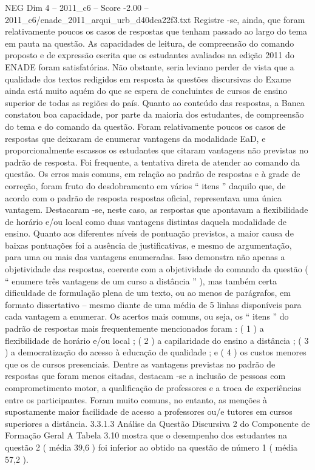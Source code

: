 \begin{textsample}{NEG Dim 4 – 2011\_c6 – Score -2.00 – 2011\_c6/enade\_2011\_arqui\_urb\_d40dca22f3.txt}
Registre -se, ainda, que foram relativamente poucos os casos de respostas que tenham passado ao largo do tema em pauta na questão.
As capacidades de leitura, de compreensão do comando proposto e de expressão escrita que os estudantes avaliados na edição 2011 do ENADE foram satisfatórias.
Não obstante, seria leviano perder de vista que a qualidade dos textos redigidos em resposta às questões discursivas do Exame ainda está muito aquém do que se espera de concluintes de cursos de ensino superior de todas as regiões do país.
Quanto ao conteúdo das respostas, a Banca constatou boa capacidade, por parte da maioria dos estudantes, de compreensão do tema e do comando da questão.
Foram relativamente poucos os casos de respostas que deixaram de enumerar vantagens da modalidade EaD, e proporcionalmente escassos os estudantes que citaram vantagens não previstas no padrão de resposta.
Foi frequente, a tentativa direta de atender ao comando da questão.
Os erros mais comuns, em relação ao padrão de respostas e à grade de correção, foram fruto do desdobramento em vários “ itens ” daquilo que, de acordo com o padrão de resposta respostas oficial, representava uma única vantagem.
Destacaram -se, neste caso, as respostas que apontavam a flexibilidade de horário e/ou local como duas vantagens distintas daquela modalidade de ensino.
Quanto aos diferentes níveis de pontuação previstos, a maior causa de baixas pontuações foi a ausência de justificativas, e mesmo de argumentação, para uma ou mais das vantagens enumeradas.
Isso demonstra não apenas a objetividade das respostas, coerente com a objetividade do comando da questão ( “ enumere três vantagens de um curso a distância ” ), mas também certa dificuldade de formulação plena de um texto, ou ao menos de parágrafos, em formato dissertativo – mesmo diante de uma média de 5 linhas disponíveis para cada vantagem a enumerar.
Os acertos mais comuns, ou seja, os “ itens ” do padrão de respostas mais frequentemente mencionados foram : ( 1 ) a flexibilidade de horário e/ou local ; ( 2 ) a capilaridade do ensino a distância ; ( 3 ) a democratização do acesso à educação de qualidade ; e ( 4 ) os custos menores que os de cursos presenciais.
Dentre as vantagens previstas no padrão de respostas que foram menos citadas, destacam -se a inclusão de pessoas com comprometimento motor, a qualificação de professores e a troca de experiências entre os participantes.
Foram muito comuns, no entanto, as menções à supostamente maior facilidade de acesso a professores ou/e tutores em cursos superiores a distância. 3.3.1.3 Análise da Questão Discursiva 2 do Componente de Formação Geral A Tabela 3.10 mostra que o desempenho dos estudantes na questão 2 ( média 39,6 ) foi inferior ao obtido na questão de número 1 ( média 57,2 ).

\end{textsample}
